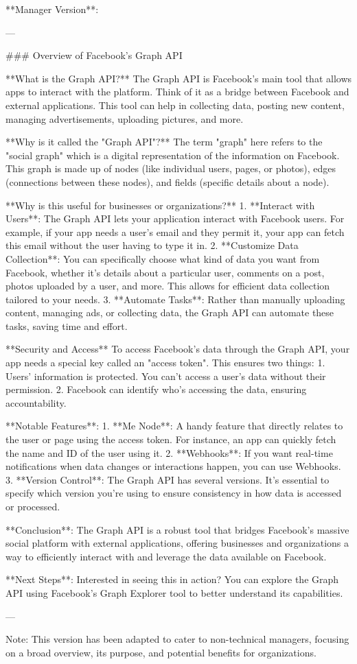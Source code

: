 **Manager Version**:

---

### Overview of Facebook's Graph API

**What is the Graph API?**
The Graph API is Facebook's main tool that allows apps to interact with the platform. Think of it as a bridge between Facebook and external applications. This tool can help in collecting data, posting new content, managing advertisements, uploading pictures, and more.

**Why is it called the "Graph API"?**
The term "graph" here refers to the "social graph" which is a digital representation of the information on Facebook. This graph is made up of nodes (like individual users, pages, or photos), edges (connections between these nodes), and fields (specific details about a node). 

**Why is this useful for businesses or organizations?**
1. **Interact with Users**: The Graph API lets your application interact with Facebook users. For example, if your app needs a user's email and they permit it, your app can fetch this email without the user having to type it in.
2. **Customize Data Collection**: You can specifically choose what kind of data you want from Facebook, whether it's details about a particular user, comments on a post, photos uploaded by a user, and more. This allows for efficient data collection tailored to your needs.
3. **Automate Tasks**: Rather than manually uploading content, managing ads, or collecting data, the Graph API can automate these tasks, saving time and effort.

**Security and Access**
To access Facebook's data through the Graph API, your app needs a special key called an "access token". This ensures two things:
1. Users' information is protected. You can't access a user's data without their permission.
2. Facebook can identify who's accessing the data, ensuring accountability.

**Notable Features**:
1. **Me Node**: A handy feature that directly relates to the user or page using the access token. For instance, an app can quickly fetch the name and ID of the user using it.
2. **Webhooks**: If you want real-time notifications when data changes or interactions happen, you can use Webhooks.
3. **Version Control**: The Graph API has several versions. It’s essential to specify which version you’re using to ensure consistency in how data is accessed or processed.

**Conclusion**:
The Graph API is a robust tool that bridges Facebook's massive social platform with external applications, offering businesses and organizations a way to efficiently interact with and leverage the data available on Facebook.

**Next Steps**:
Interested in seeing this in action? You can explore the Graph API using Facebook's Graph Explorer tool to better understand its capabilities.

--- 

Note: This version has been adapted to cater to non-technical managers, focusing on a broad overview, its purpose, and potential benefits for organizations.
